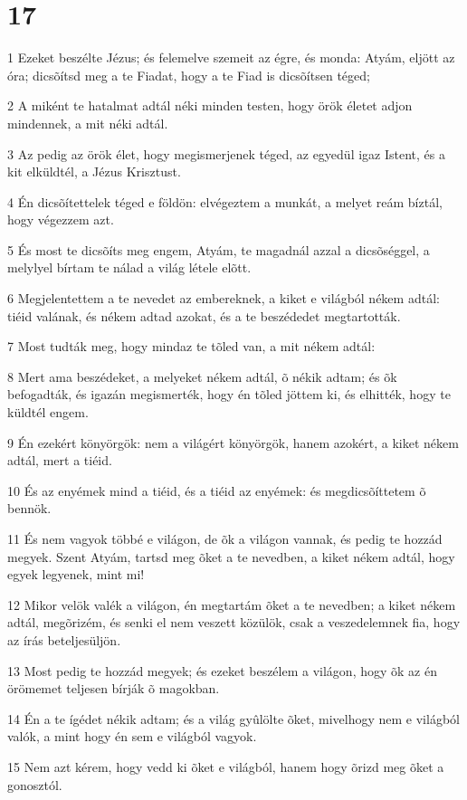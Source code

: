 \chapter{17}

\par 1 Ezeket beszélte Jézus; és felemelve szemeit az égre, és monda: Atyám, eljött az óra; dicsõítsd meg a te Fiadat, hogy a te Fiad is dicsõítsen téged;
\par 2 A miként te hatalmat adtál néki minden testen, hogy örök életet  adjon mindennek, a mit néki adtál.
\par 3 Az pedig az örök élet, hogy megismerjenek téged, az egyedül igaz Istent, és a kit elküldtél, a Jézus Krisztust.
\par 4 Én dicsõítettelek téged e földön: elvégeztem a munkát, a melyet reám bíztál, hogy végezzem azt.
\par 5 És most te dicsõíts meg engem, Atyám, te magadnál azzal a dicsõséggel, a melylyel bírtam te nálad a világ létele elõtt.
\par 6 Megjelentettem a te nevedet az embereknek, a kiket e világból nékem adtál: tiéid valának, és nékem adtad azokat, és a te beszédedet megtartották.
\par 7 Most tudták meg, hogy mindaz te tõled van, a mit nékem adtál:
\par 8 Mert ama beszédeket, a melyeket nékem adtál, õ nékik adtam; és õk befogadták, és igazán megismerték, hogy én tõled jöttem ki, és elhitték, hogy te küldtél engem.
\par 9 Én ezekért könyörgök: nem a világért könyörgök, hanem azokért, a kiket nékem adtál, mert a tiéid.
\par 10 És az enyémek mind a tiéid, és a tiéid az enyémek: és megdicsõíttetem õ bennök.
\par 11 És nem vagyok többé e világon, de õk a világon vannak, és pedig te hozzád megyek. Szent Atyám, tartsd meg õket a te nevedben, a kiket nékem adtál, hogy egyek legyenek, mint  mi!
\par 12 Mikor velök valék a világon, én megtartám õket a te nevedben; a kiket nékem adtál, megõrizém, és senki el nem veszett közülök, csak a veszedelemnek fia, hogy az írás  beteljesüljön.
\par 13 Most pedig te hozzád megyek; és ezeket beszélem a világon, hogy õk az én örömemet teljesen bírják õ magokban.
\par 14 Én a te ígédet nékik adtam; és a világ gyûlölte õket, mivelhogy nem e világból valók, a mint hogy én sem e világból vagyok.
\par 15 Nem azt kérem, hogy vedd ki õket e világból, hanem hogy õrizd meg õket a gonosztól.

